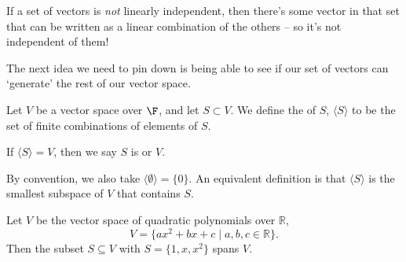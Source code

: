 \documentclass[a4paper]{scrartcl}
\begin{document}
If a set of vectors is \emph{not} linearly independent, then there's some vector in that set that can be written as a linear combination of the others -- so it's not independent of them!

The next idea we need to pin down is being able to see if our set of vectors can `generate' the rest of our vector space. 


\begin{definition}[Span]
    Let $V$ be a vector space over $\F$, and let $S \subset V$. We define the  of $S$, $\langle S \rangle$ to be the set of finite combinations of elements of $S$.

    If $\langle S \rangle = V$, then we say $S$ is  or  $V$.
\end{definition}

\begin{remark}
    By convention, we also take $\langle \emptyset \rangle = \{ 0\}$. An equivalent definition is that $\langle S \rangle$ is the smallest subspace of $V$ that contains $S$.
\end{remark}

\begin{example}
    Let $V$ be the vector space of quadratic polynomials over $\mathbb{R}$, 
    $$V = \{ax^2 + bx + c \mid a, b, c \in \mathbb{R}\}.$$ 
    Then the subset $S \subseteq V$ with $S = \{1, x, x^2\}$ spans $V$.
\end{example}



\end{document}
